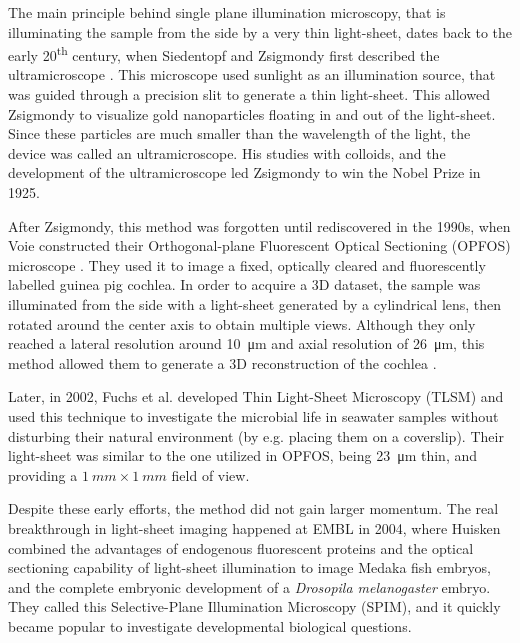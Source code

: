   

  The main principle behind single plane illumination microscopy, that is illuminating the sample from the side by a very thin light-sheet, dates back to the early 20\textsuperscript{th} century, when Siedentopf and Zsigmondy first described the ultramicroscope \cite{siedentopf_uber_1902}. This microscope used sunlight as an illumination source, that was guided through a precision slit to generate a thin light-sheet. This allowed Zsigmondy to visualize gold nanoparticles floating in and out of the light-sheet. Since these particles are much smaller than the wavelength of the light, the device was called an ultramicroscope. His studies with colloids, and the development of the ultramicroscope led Zsigmondy to win the Nobel Prize in 1925.

  After Zsigmondy, this method was forgotten until rediscovered in the 1990s, when Voie \etal constructed their Orthogonal-plane Fluorescent Optical Sectioning (OPFOS) microscope \cite{voie_orthogonal-plane_1993}. They used it to image a fixed, optically cleared and fluorescently labelled guinea pig cochlea. In order to acquire a 3D dataset, the sample was illuminated from the side with a light-sheet generated by a cylindrical lens, then rotated around the center axis to obtain multiple views. Although they only reached a lateral resolution around \SI{10}{\micro m} and axial resolution of \SI{26}{\micro m}, this method allowed them to generate a 3D reconstruction of the cochlea \cite{voie_three-dimensional_1995}.

  Later, in 2002, Fuchs et al. developed Thin Light-Sheet Microscopy (TLSM) \cite{fuchs_thin_2002} and used this technique to investigate the microbial life in seawater samples without disturbing their natural environment (by e.g. placing them on a coverslip). Their light-sheet was similar to the one utilized in OPFOS, being \SI{23}{\micro m} thin, and providing a $\SI{1}{mm} \times \SI{1}{mm}$ field of view.

  Despite these early efforts, the method did not gain larger momentum. The real breakthrough in light-sheet imaging happened at EMBL in 2004, where Huisken \etal \cite{huisken_optical_2004} combined the advantages of endogenous fluorescent proteins and the optical sectioning capability of light-sheet illumination to image Medaka fish embryos, and the complete embryonic development of a \textit{Drosopila melanogaster} embryo. They called this Selective-Plane Illumination Microscopy (SPIM), and it quickly became popular to investigate developmental biological questions.

